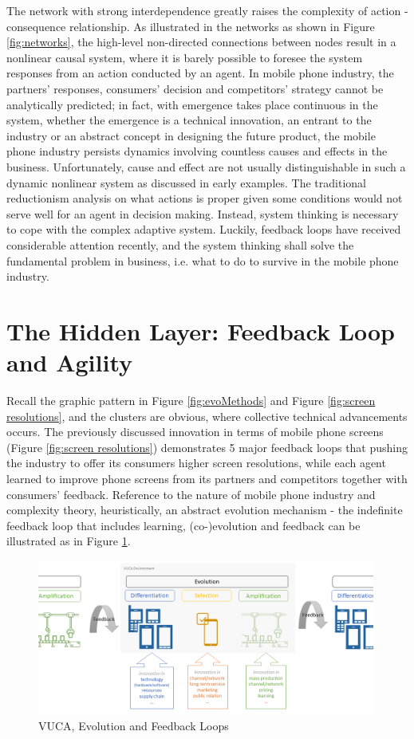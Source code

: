 \documentclass[utf8,english]{gradu3}
\begin{document}
The network with strong interdependence greatly raises the complexity of action - consequence relationship. As illustrated in the networks as shown in Figure \ref{fig:networks}, the high-level non-directed connections between nodes result in a nonlinear causal system, where it is barely possible to foresee the system responses from an action conducted by an agent. In mobile phone industry, the partners' responses, consumers' decision and competitors' strategy cannot be analytically predicted; in fact, with emergence takes place continuous in the system, whether the emergence is a technical innovation, an entrant to the industry or an abstract concept in designing the future product, the mobile phone industry persists dynamics involving countless causes and effects in the business. Unfortunately, cause and effect are not usually distinguishable in such a dynamic nonlinear system as discussed in early examples. The traditional reductionism analysis on what actions is proper given some conditions would not serve well for an agent in decision making. Instead, system thinking is necessary to cope with the complex adaptive system. Luckily, feedback loops have received considerable attention recently, and the system thinking shall solve the fundamental problem in business, i.e. what to do to survive in the mobile phone industry.

\section{The Hidden Layer: Feedback Loop and Agility}

Recall the graphic pattern in Figure \ref{fig:evoMethods} and Figure \ref{fig:screen resolutions}, and the clusters are obvious, where collective technical advancements occurs. The previously discussed innovation in terms of mobile phone screens (Figure \ref{fig:screen resolutions}) demonstrates 5 major feedback loops that pushing the industry to offer its consumers higher screen resolutions, while each agent learned to improve phone screens from its partners and competitors together with consumers' feedback. Reference to the nature of mobile phone industry and complexity theory, heuristically, an abstract evolution mechanism - the indefinite feedback loop that includes learning, (co-)evolution and feedback can be illustrated as in Figure \ref{fig:feeback loops}.

\begin{figure}[htb]
    \centering
    \includegraphics[width=0.99\textwidth]{feedback.png}
    \caption{VUCA, Evolution and Feedback Loops}
    \label{fig:feeback loops}
\end{figure}
\end{document}
